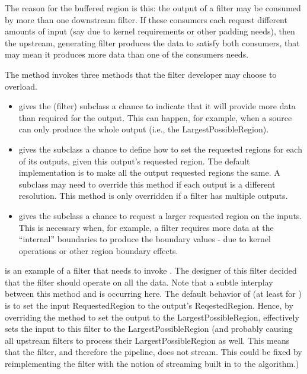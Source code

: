 The reason for the buffered region is this: the output of a filter may be
consumed by more than one downstream filter. If these consumers each request
different amounts of input (say due to kernel requirements or other padding
needs), then the upstream, generating filter produces the data to satisfy
both consumers, that may mean it produces more data than one of the
consumers needs.

The  method invokes
three methods that the filter developer may choose to overload.

\begin{itemize}
        \item {} gives the
        (filter) subclass a chance to indicate that it will provide more data
        than required for the output. This can happen, for example, when a
        source can only produce the whole output (i.e., the
        LargestPossibleRegion).

        \item {} gives
        the subclass a chance to define how to set the requested regions for
        each of its outputs, given this output's requested region.  The default
        implementation is to make all the output requested regions the same.
        A subclass may need to override this method if each output is a
        different resolution. This method is only overridden if a filter has
        multiple outputs.

        \item {} gives the subclass a
        chance to
        request a larger requested region on the inputs. This is necessary
        when, for example, a filter requires more data at the ``internal''
        boundaries to produce the boundary values - due to kernel operations
        or other region boundary effects.
\end{itemize}

 is an example of a filter that needs to
invoke . The designer of this
filter decided that the filter should operate on all the data. Note
that a subtle interplay between this method and
 is occurring here. The default
behavior of  (at least for
) is to set the input RequestedRegion to
the output's ReqestedRegion. Hence, by overriding the method
 to set the output to the
LargestPossibleRegion, effectively sets the input to this filter to
the LargestPossibleRegion (and probably causing all upstream filters
to process their LargestPossibleRegion as well. This means that the
filter, and therefore the pipeline, does not stream. This could be
fixed by reimplementing the filter with the notion of streaming built
in to the algorithm.)

